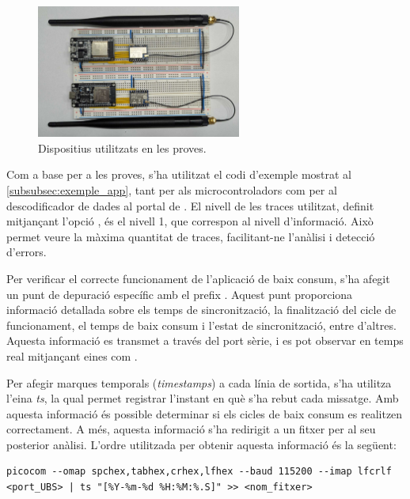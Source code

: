 \documentclass{tfgitic}[2024/07/01]
\begin{document}
{\begin{figure}
    \centering
    \includegraphics[width=0.6\textwidth]{imatges/plaques.jpeg}
    \caption{Dispositius utilitzats en les proves.}
    \label{fig:dispositius_proves}                                                                                  
\end{figure} 

Com a base per a les proves, s'ha utilitzat el codi d'exemple mostrat al \autoref{subsubsec:exemple_app}, tant per als microcontroladors com per al descodificador de dades al portal de . El nivell de les traces utilitzat, definit mitjançant l'opció , és el nivell 1, que correspon al nivell d'informació. Això permet veure la màxima quantitat de traces, facilitant-ne l'anàlisi i detecció d'errors.

Per verificar el correcte funcionament de l'aplicació de baix consum, s'ha afegit un punt de depuració específic amb el prefix . Aquest punt proporciona informació detallada sobre els temps de sincronització, la finalització del cicle de funcionament, el temps de baix consum i l'estat de sincronització, entre d'altres. Aquesta informació es transmet a través del port sèrie, i es pot observar en temps real mitjançant eines com .

Per afegir marques temporals (\emph{timestamps}) a cada línia de sortida, s'ha utilitza l'eina \emph{ts}, la qual permet registrar l'instant en què s'ha rebut cada missatge. Amb aquesta informació és possible determinar si els cicles de baix consum es realitzen correctament. A més, aquesta informació s'ha redirigit a un fitxer per al seu posterior anàlisi. L'ordre utilitzada per obtenir aquesta informació és la següent:

\begin{lstlisting}[style=bashStyle]
picocom --omap spchex,tabhex,crhex,lfhex --baud 115200 --imap lfcrlf <port_UBS> | ts "[%Y-%m-%d %H:%M:%.S]" >> <nom_fitxer>
\end{lstlisting}

}
\end{document}
